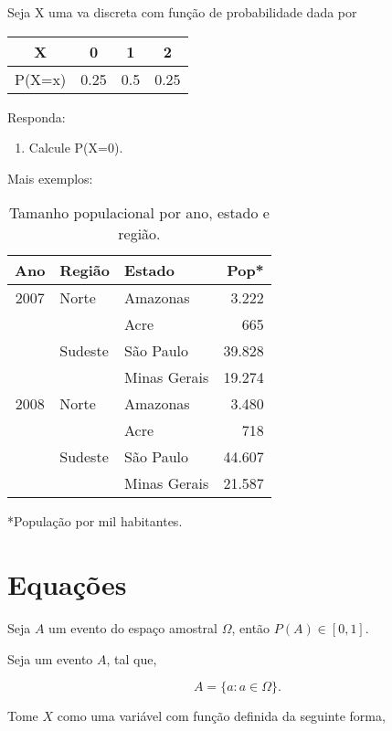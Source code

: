 \documentclass{article}
\begin{document}
Seja X uma va discreta com função de probabilidade dada por

\begin{tabular}{c|ccc} 
X      & 0    & 1    & 2  \\ \hline
P(X=x) & 0.25 &  0.5 & 0.25   \\
\end{tabular}

Responda:

\begin{enumerate}
    \item Calcule P(X=0).
\end{enumerate}


Mais exemplos:

\begin{table}[h]
    \centering
    \caption{Tamanho populacional por ano, estado e região.}
    \vspace{0.3cm}
    \begin{tabular}{cllr}
\hline
{\bf Ano}& {\bf Região}& {\bf Estado} & {\bf Pop*}
\\ \hline \hline
2007 & Norte & Amazonas & 3.222 \\ \cline{3-4}
& & Acre & 665 \\ \cline{2-4}
& Sudeste & São Paulo & 39.828 \\ \cline{3-4}
& & Minas Gerais & 19.274 \\ \hline
2008 & Norte & Amazonas & 3.480 \\ \cline{3-4}
& & Acre & 718 \\ \cline{2-4}
& Sudeste & São Paulo & 44.607 \\ \cline{3-4}
& & Minas Gerais & 21.587 \\ \hline
\end{tabular}
    
    \label{tab:my_label}
\end{table}

*População por mil habitantes.



\section{Equações}

Seja $A$ um evento do espaço amostral $\Omega$, então $P(A)\in [0,1]$.

Seja um evento $A$, tal que,

$$A=\{a: a\in \Omega \}.$$

Tome $X$ como uma variável com função definida da seguinte forma,
\end{document}
